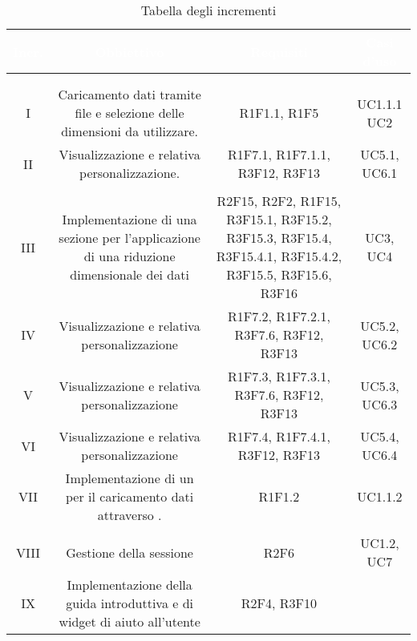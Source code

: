 \setlength\colA{1.5cm}
\setlength\colB{8cm}
\setlength\colC{4cm}
\setlength\colD{2cm}
\setlength\total{\dimexpr\colA+\colB+\colC+\colD+6\tabcolsep\relax}
\begin{longtable}{C{\colA} C{\colB} C{\colC} C{\colD}}
		\textcolor{white}{\textbf{Incr.}} & 
		\textcolor{white}{\textbf{Obbiettivo}} & 
		\textcolor{white}{\textbf{Requisiti}} & 
		\textcolor{white}{\textbf{Casi d'uso}} \\
		\endfirsthead
	    \\
	    \endfoot
	    \caption{Tabella degli incrementi}
	    \endlastfoot


\\
I &
Caricamento dati tramite file e selezione delle dimensioni da utilizzare.& 
R1F1.1, R1F5 & 
UC1.1.1 \newline UC2\\
II &
Visualizzazione  e relativa personalizzazione.& 
R1F7.1, R1F7.1.1, R3F12, R3F13 & 
UC5.1, UC6.1\\
\\
III & 
Implementazione di una sezione per l'applicazione di una riduzione dimensionale dei dati & 
R2F15, R2F2, R1F15, R3F15.1, R3F15.2, R3F15.3, R3F15.4, R3F15.4.1, R3F15.4.2, R3F15.5, R3F15.6, R3F16& 
UC3, UC4\\
IV & 
Visualizzazione  e relativa personalizzazione & 
R1F7.2, R1F7.2.1, R3F7.6, R3F12, R3F13 & 
UC5.2, UC6.2\\
V & 
Visualizzazione  e relativa personalizzazione & 
R1F7.3, R1F7.3.1, R3F7.6, R3F12, R3F13& 
UC5.3, UC6.3\\
VI & 
Visualizzazione  e relativa personalizzazione & 
R1F7.4, R1F7.4.1, R3F12, R3F13& 
UC5.4, UC6.4\\
VII & 
Implementazione di un  per il caricamento dati attraverso . & 
R1F1.2 & 
UC1.1.2\\

\\
VIII & 
Gestione della sessione & 
R2F6 & 
UC1.2, UC7\\
IX & 
Implementazione della guida introduttiva e di widget di aiuto all'utente & 
R2F4, R3F10& 
\\


\end{longtable}
